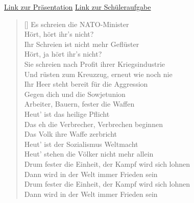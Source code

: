 \documentclass[8pt, letterpaper]{article}
\begin{document}
\href{https://jakiki6.github.io/ddr/}{Link zur Präsentation}
\href{https://jakiki6.github.io/ddr/#/12}{Link zur Schüleraufgabe}

\newpage

\settowidth{\versewidth}{Drum fester die Einheit, der Kampf wird sich lohnen}
\begin{verse}[\versewidth]
Es schreien die NATO-Minister \\
Hört, hört ihr's nicht? \\
Ihr Schreien ist nicht mehr Geflüster \\
Hört, ja hört ihr's nicht? \\
Sie schreien nach Profit ihrer Kriegsindustrie \\
Und rüsten zum Kreuzzug, erneut wie noch nie \\
Ihr Heer steht bereit für die Aggression \\
Gegen dich und die Sowjetunion \\

Arbeiter, Bauern, fester die Waffen \\
Heut' ist das heilige Pflicht \\
Das eh die Verbrecher, Verbrechen beginnen \\
Das Volk ihre Waffe zerbricht \\
Heut' ist der Sozialismus Weltmacht \\
Heut' stehen die Völker nicht mehr allein \\
Drum fester die Einheit, der Kampf wird sich lohnen \\
Dann wird in der Welt immer Frieden sein \\
Drum fester die Einheit, der Kampf wird sich lohnen \\
Dann wird in der Welt immer Frieden sein
\end{verse}
\end{document}
